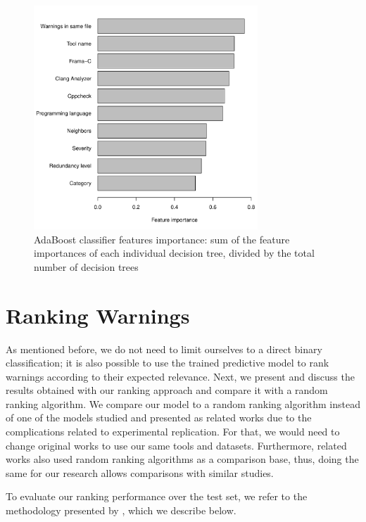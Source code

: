 \begin{figure}
\centering
\includegraphics[width=0.75\textwidth]{figures/importance.pdf}
  \caption{AdaBoost classifier features importance: sum of the feature importances of each individual decision tree, divided by the total number of decision trees}\label{fig:feature_importance}
\end{figure}

\section{Ranking Warnings}
\label{sec:results_ranking}

As mentioned before, we do not need to limit ourselves to a direct binary
classification; it is also possible to use the trained predictive model to rank
warnings according to their expected relevance. Next, we present and discuss
the results obtained with our ranking approach and compare it with a random
ranking algorithm.  We compare our model to a random ranking algorithm instead
of one of the models studied and presented as related works due to the
complications related to experimental replication. For that, we would need to
change original works to use our same tools and datasets. Furthermore, related
works also used random ranking algorithms as a comparison base, thus, doing the
same for our research allows comparisons with similar studies.

To evaluate our ranking
performance over the test set, we refer to the methodology presented by
\cite{kremenek2004correlation}, which we describe below.

